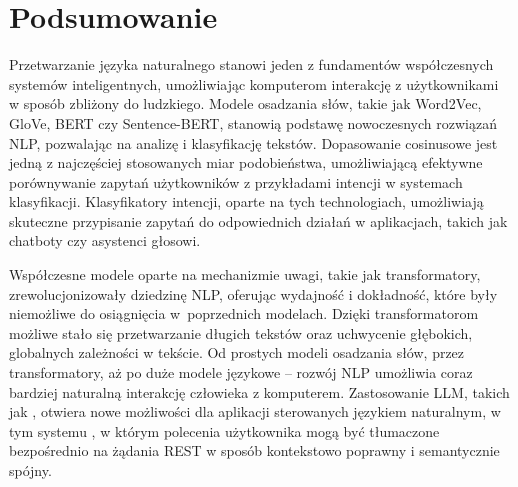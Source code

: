 	\section{Podsumowanie}
	
	Przetwarzanie języka naturalnego stanowi jeden z fundamentów współczesnych systemów inteligentnych, umożliwiając komputerom interakcję z użytkownikami w sposób zbliżony do ludzkiego. Modele osadzania słów, takie jak Word2Vec, GloVe, BERT czy Sentence-BERT, stanowią podstawę nowoczesnych rozwiązań NLP, pozwalając na analizę i klasyfikację tekstów. Dopasowanie cosinusowe jest jedną z najczęściej stosowanych miar podobieństwa, umożliwiającą efektywne porównywanie zapytań użytkowników z przykładami intencji w systemach klasyfikacji. Klasyfikatory intencji, oparte na tych technologiach, umożliwiają skuteczne przypisanie zapytań do odpowiednich działań w aplikacjach, takich jak chatboty czy asystenci głosowi.
	
	Współczesne modele oparte na mechanizmie uwagi, takie jak transformatory, zrewolucjonizowały dziedzinę NLP, oferując wydajność i dokładność, które były niemożliwe do osiągnięcia w~poprzednich modelach. Dzięki transformatorom możliwe stało się przetwarzanie długich tekstów oraz uchwycenie głębokich, globalnych zależności w tekście.
	Od prostych modeli osadzania słów, przez transformatory, aż po duże modele językowe -- rozwój NLP umożliwia coraz bardziej naturalną interakcję człowieka z komputerem. Zastosowanie LLM, takich jak , otwiera nowe możliwości dla aplikacji sterowanych językiem naturalnym, w tym systemu , w którym polecenia użytkownika mogą być tłumaczone bezpośrednio na żądania REST w sposób kontekstowo poprawny i semantycznie spójny.
	
